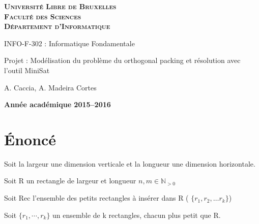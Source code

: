 \documentclass[a4paper,10pt]{article}
\begin{document}
\begin{titlepage}
    \begin{center}
        \textbf{\textsc{Université Libre de Bruxelles}}\\
        \textbf{\textsc{Faculté des Sciences}}\\
        \textbf{\textsc{Département d'Informatique}}

        \vfill{}
        \vfill{}

        \begin{center}
            {\Huge INFO-F-302 : Informatique Fondamentale}
        \end{center}

        {\Huge \par}

        \begin{center}
            {\LARGE Projet : Modélisation du problème du orthogonal packing et résolution avec l’outil MiniSat}
        \end{center}

        {\Huge \par}

        \begin{center}
            {\large A. Caccia, A. Madeira Cortes}
        \end{center}

        {\Huge \par}
        \vfill{}
        \vfill{}

        {\large\par}
        \vfill{}
        \vfill{}

        \textbf{Année académique 2015--2016}
    \end{center}
\end{titlepage}

\tableofcontents
\newpage

\section{Énoncé}

Soit la largeur une dimension verticale et la longueur une dimension horizontale.

Soit R un rectangle de largeur et longueur $n, m \in \mathbb{N}_{>0}$

Soit Rec l'ensemble des petits rectangles à insérer dans R ( $\{ r_1, r_2, \ldots r_k \}$)

Soit $\{r_1,\cdots,r_k\}$ un ensemble de k rectangles, chacun plus petit que R.
\end{document}
